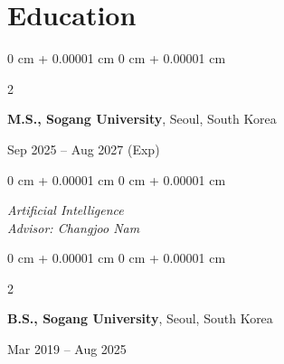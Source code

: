 \documentclass[10pt, letterpaper]{article}
\newenvironment{highlightsforbulletentries}{
    \begin{itemize}[
        topsep=0.10 cm,
        parsep=0.10 cm,
        partopsep=0pt,
        itemsep=0pt,
        leftmargin=10pt
    ]
}{
    \end{itemize}
} %
\newenvironment{onecolentry}{
    \begin{adjustwidth}{
        0 cm + 0.00001 cm
    }{
        0 cm + 0.00001 cm
    }
}{
    \end{adjustwidth}
} %
\newenvironment{twocolentry}[2][]{
    \onecolentry
    \def\secondColumn{#2}
    \setcolumnwidth{\fill, 4.5 cm}
    \begin{paracol}{2}
}{
    \switchcolumn \raggedleft \secondColumn
    \end{paracol}
    \endonecolentry
} %
\begin{document}
        \vspace{0.2 cm}


    







    
    \section{Education}

        \begin{twocolentry}{
            Sep 2025 – Aug 2027 (Exp)
        }
            \textbf{M.S., Sogang University}, Seoul, South Korea
        \end{twocolentry}

        \vspace{0.10 cm}
        \begin{onecolentry}
            \textit{Artificial Intelligence}\\
            \textit{Advisor: Changjoo Nam}
        \end{onecolentry}

        \vspace{0.2 cm}

        \begin{twocolentry}{
            Mar 2019 – Aug 2025
        }
            \textbf{B.S., Sogang University}, Seoul, South Korea
        \end{twocolentry}
\end{document}
